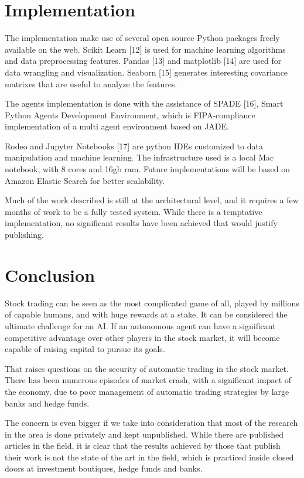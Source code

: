 \documentclass[prodmode,acmtecs]{acmsmall} %
\begin{document}
\section {Implementation}

The implementation make use of several open source Python packages freely available on the web. Scikit Learn [12] is used for machine learning algorithms and data preprocessing features. Pandas [13] and matplotlib [14] are used for data wrangling and visualization. Seaborn [15] generates interesting covariance matrixes that are useful to analyze the features.

The agents implementation is done with the assistance of SPADE [16], Smart Python Agents Development Environment, which is FIPA-compliance implementation of a multi agent environment based on JADE.

Rodeo and Jupyter Notebooks [17] are python IDEs customized to data manipulation and machine learning. The infrastructure used is a local Mac notebook, with 8 cores and 16gb ram. Future implementations will be based on Amazon Elastic Search for better scalability.

Much of the work described is still at the architectural level, and it requires a few months of work to be a fully tested system. While there is a temptative implementation, no significant results have been achieved that would justify publishing. 

\section {Conclusion}

Stock trading can be seen as the most complicated game of all, played by millions of capable humans, and with huge rewards at a stake. It can be considered the ultimate challenge for an AI. If an autonomous agent can have a significant competitive advantage over other players in the stock market, it will become capable of raising capital to pursue its goals.

That raises questions on the security of automatic trading in the stock market. There has been numerous episodes of market crash, with a significant impact of the economy, due to poor management of automatic trading strategies by large banks and hedge funds. 

The concern is even bigger if we take into consideration that most of the research in the area is done privately and kept unpublished. While there are published articles in the field, it is clear that the results achieved by those that publish their work is not the state of the art in the field, which is practiced inside closed doors at investment boutiques, hedge funds and banks.
\end{document}
